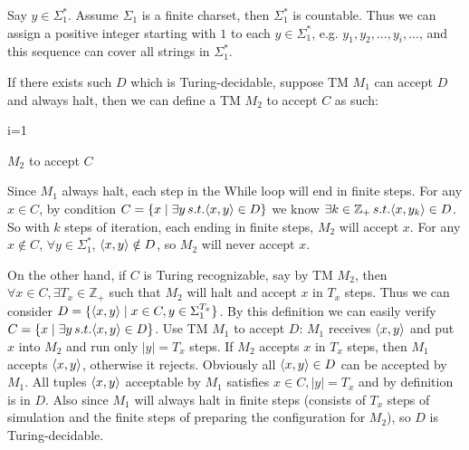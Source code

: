 \documentclass{homework}
\begin{document}
\begin{solution}
Say $y\in \Sigma_1^*$. Assume $\Sigma_1$ is a finite charset, then $\Sigma_1^*$ is countable. Thus we can assign a positive integer starting with $1$ to each $y\in\Sigma_1^*$, e.g. $y_1,y_2,...,y_i,...$, and this sequence can cover all strings in $\Sigma_1^*$. 

If there exists such $D$ which is Turing-decidable, suppose TM $M_1$ can accept $D$ and always halt, then we can define a TM $M_2$ to accept $C$ as such: 
\begin{algorithm*}[H]
  i=1\;
  \caption{$M_2$ to accept $C$}
\end{algorithm*}

Since $M_1$ always halt, each step in the While loop will end in finite steps. For any $x\in C$, by condition $C = \{ x \mid \exists y\, s.t. \langle x,y\rangle \in D\}$ we know $\exists k\in\mathbb{Z}_+\, s.t. \langle x,y_k\rangle\in D$. So with $k$ steps of iteration, each ending in finite steps, $M_2$ will accept $x$. For any $x\notin C$, $\forall y\in\Sigma_1^*$, $\langle x,y\rangle\notin D$, so $M_2$ will never accept $x$.

On the other hand, if $C$ is Turing recognizable, say by TM $M_2$, then $\forall x\in C, \exists T_x\in\mathbb{Z}_+$ such that $M_2$ will halt and accept $x$ in $T_x$ steps. Thus we can consider $D=\{\langle x,y\rangle\mid x\in C, y\in \Sigma_1^{T_x}\}$. By this definition we can easily verify $C = \{ x \mid \exists y\, s.t. \langle x,y\rangle \in D\}$. Use TM $M_1$ to accept $D$: $M_1$ receives $\langle x,y\rangle$ and put $x$ into $M_2$ and run only $|y|=T_x$ steps. If $M_2$ accepts $x$ in $T_x$ steps, then $M_1$ accepts $\langle x,y\rangle$, otherwise it rejects. Obviously all $\langle x,y\rangle\in D$ can be accepted by $M_1$. All tuples $\langle x,y\rangle$ acceptable by $M_1$ satisfies $x\in C,|y|=T_x$ and by definition is in $D$. Also since $M_1$ will always halt in finite steps (consists of $T_x$ steps of simulation and the finite steps of preparing the configuration for $M_2$), so $D$ is Turing-decidable.
\end{solution}
\end{document}
